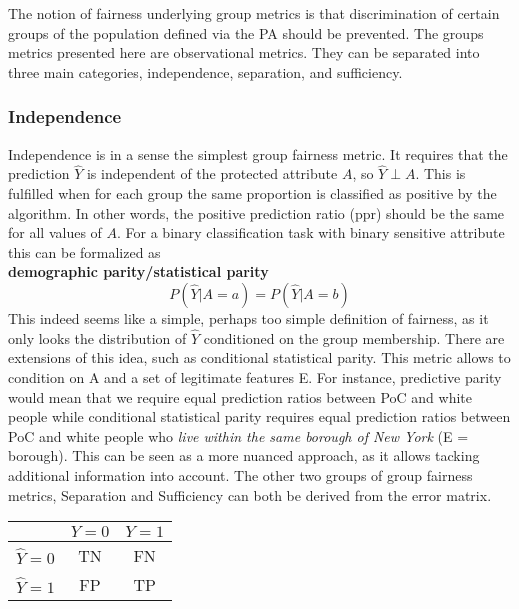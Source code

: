The notion of fairness underlying group metrics is that discrimination of certain groups of the population defined via the PA should be prevented. The groups metrics presented here are observational metrics. They can be separated into three main categories, independence, separation, and sufficiency. 

\subsubsection*{Independence}
Independence is in a sense the simplest group fairness metric. It requires that the prediction $\hat{Y}$ is independent of the protected attribute $A$, so $\hat{Y} \perp A$. This is fulfilled when for each group the same proportion is classified as positive by the algorithm. In other words, the positive prediction ratio (ppr) should be the same for all values of $A$. For a binary classification task with binary sensitive attribute this can be formalized as \\
\textbf{demographic parity/statistical parity}
$$P(\hat{Y} | A = a) = P(\hat{Y} | A = b)$$
This indeed seems like a simple, perhaps too simple definition of fairness, as it only looks the distribution of $\hat{Y}$ conditioned on the group membership. There are extensions of this idea, such as conditional statistical parity. This metric allows to condition on A and a set of legitimate features E. For instance, predictive parity would mean that we require equal prediction ratios between PoC and white people while conditional statistical parity requires equal prediction ratios between PoC and white people who \textit{live within the same borough of New York} (E = borough). This can be seen as a more nuanced approach, as it allows tacking additional information into account.
The other two groups of group fairness metrics, Separation and Sufficiency can both be derived from the error matrix.
\begin{center}
    \renewcommand{\arraystretch}{1.5}  %
    \begin{tabular}{c|c|c|}
        \hline
        & \(Y = 0\) & \(Y = 1\) \\
        \hline
        \(\hat{Y} = 0\) & TN & FN \\
        \hline
        \(\hat{Y} = 1\) & FP & TP \\
    \end{tabular}
\end{center}

